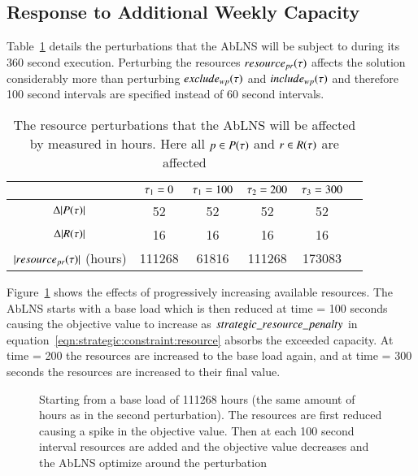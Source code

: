 \subsection{Response to Additional Weekly Capacity}\label{sec:increase_week_cap}
Table~\ref{tab:responses:resource-addition} details the perturbations that the
AbLNS will be subject to during its 360 second execution. Perturbing the
resources $\ParStrategicResource$ affects the solution considerably more than
perturbing $exclude_{wp}(\tau)$ and $include_{wp}(\tau)$ and therefore 100
second intervals are specified instead of 60 second intervals.

\begin{table}[H]
	\centering
	\begin{tabular}{cccccc}
	\toprule
	                                    & $\tau_1 = 0$ & $\tau_1 = 100$ & $\tau_2 = 200$ & $\tau_3 = 300$ \\ \midrule
	$\Delta |P(\tau)|$               & 52                   & 52                     & 52                     & 52                     \\ \midrule
	$\Delta |R(\tau)|$             & 16                   & 16                     & 16                     & 16                     \\ \midrule
	$ |resource_{pr}(\tau)|$ (hours)& 111268               &  61816                 & 111268                 & 173083                 \\ \bottomrule
	\end{tabular}
	\caption{The resource perturbations that the AbLNS will be affected by measured in hours. Here all $p \in P(\tau)$ and $r \in R(\tau)$ are 
		affected
	}\label{tab:responses:resource-addition}
\end{table}

Figure~\ref{fig:responses:resources-addition} shows the effects of progressively
increasing  available resources. The AbLNS starts with a base load which is
then reduced at time = 100 seconds causing the objective value to increase
as $strategic\_resource\_penalty$ in equation~\ref{eqn:strategic:constraint:resource}
absorbs the exceeded capacity. At time = 200 the resources are increased to the
base load again, and at time = 300 seconds the resources are increased to their
final value.

\begin{figure}[H]%
	\centering
	\resizebox{10cm}{!}{
		
	}
	\caption{Starting from a base load of 111268 hours (the same amount of 
		hours as in the second perturbation). The resources are first reduced
		causing a spike in the objective value. Then at each 100 second interval
		resources are added and the objective value decreases and the AbLNS 
		optimize around the perturbation
	}\label{fig:responses:resources-addition}
\end{figure}

